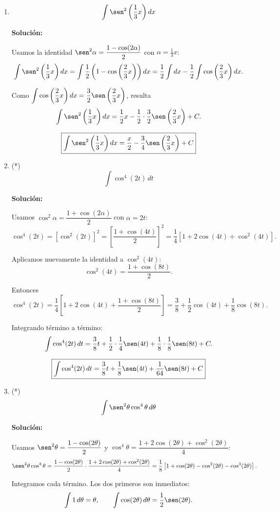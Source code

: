 \documentclass[12pt]{article}
\newcommand{\solucion}{%
    \vspace{0.8em}%
    \textbf{Solución:}%
}
\begin{document}
\begin{enumerate}[label=\alph*.-]
    \item
    \[
    \int\sen^2\left(\frac13x\right)dx
    \]

    \solucion

    Usamos la identidad $\sen^2\alpha=\dfrac{1-\cos(2\alpha)}{2}$ con
    $\alpha=\frac13x$:
    \[
    \int\sen^2\left(\frac13x\right)dx
    =\int\frac12\left(1-\cos\left(\frac23x\right)\right)dx
    =\frac12\int dx-\frac12\int\cos\left(\frac23x\right)dx.
    \]

    Como $\displaystyle\int\cos\left(\frac23x\right)dx=\frac32\sen\left(\frac23x\right)$,
    resulta
    \[
    \int\sen^2\left(\frac13x\right)dx=\frac12x-\frac12\cdot\frac32\sen\left(\frac23x\right)+C.
    \]

    \[
    \boxed{
    \int\sen^2\left(\frac13x\right)dx=\frac{x}{2}-\frac34\sen\left(\frac23x\right)+C
    }
    \]


    \item (*)
    \[
    \int\cos^4(2t)\,dt
    \]

    \solucion

    Usamos $\cos^2\alpha=\dfrac{1+\cos(2\alpha)}{2}$ con $\alpha=2t$:
    \[
    \cos^4(2t)=\left[\cos^2(2t)\right]^2
    =\left[\frac{1+\cos(4t)}{2}\right]^2
    =\frac14\left[1+2\cos(4t)+\cos^2(4t)\right].
    \]

    Aplicamos nuevamente la identidad a $\cos^2(4t)$:
    \[
    \cos^2(4t)=\frac{1+\cos(8t)}{2}.
    \]

    Entonces
    \[
    \cos^4(2t)=\frac14\left[1+2\cos(4t)+\frac{1+\cos(8t)}{2}\right]
    =\frac38+\frac12\cos(4t)+\frac18\cos(8t).
    \]

    Integrando término a término:
    \[
    \int\cos^4(2t)\,dt
    =\frac38t+\frac12\cdot\frac14\sen(4t)+\frac18\cdot\frac18\sen(8t)+C.
    \]

    \[
    \boxed{
    \int\cos^4(2t)\,dt=\frac38t+\frac18\sen(4t)+\frac{1}{64}\sen(8t)+C
    }
    \]


    \item (*)
    \[
    \int\sen^2\theta\cos^4\theta\,d\theta
    \]

    \solucion

    Usamos $\sen^2\theta=\dfrac{1-\cos(2\theta)}{2}$ y
    $\cos^4\theta=\dfrac{1+2\cos(2\theta)+\cos^2(2\theta)}{4}$:
    \[
    \sen^2\theta\cos^4\theta
    =\frac{1-\cos(2\theta)}{2}\cdot\frac{1+2\cos(2\theta)+\cos^2(2\theta)}{4}
    =\frac18\left[1+\cos(2\theta)-\cos^2(2\theta)-\cos^3(2\theta)\right].
    \]

    Integramos cada término. Los dos primeros son inmediatos:
    \[
    \int 1\,d\theta=\theta,
    \qquad
    \int\cos(2\theta)\,d\theta=\frac12\sen(2\theta).
    \]


\end{enumerate}
\end{document}
